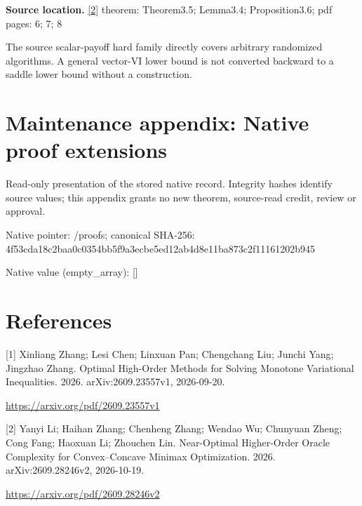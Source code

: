 \documentclass[10pt,a4paper]{article}
\begin{document}
\textbf{Source location.} \href{https://arxiv.org/pdf/2609.28246v2}{[2]} theorem: Theorem3.5; Lemma3.4; Proposition3.6; pdf pages: 6; 7; 8



The source scalar-payoff hard family directly covers arbitrary randomized algorithms. A general vector-VI lower bound is not converted backward to a saddle lower bound without a construction.



\section{Maintenance appendix: Native proof extensions}


Read-only presentation of the stored native record. Integrity hashes identify source values; this appendix grants no new theorem, source-read credit, review or approval.



Native pointer: /proofs; canonical SHA-256: 4f53cda18c2baa0c0354bb5f\allowbreak{}9a3ecbe5ed12ab4d8e11ba87\allowbreak{}3c2f11161202b945



Native value (empty\_array): []



\section{References}


[1] Xinliang Zhang; Lesi Chen; Linxuan Pan; Chengchang Liu; Junchi Yang; Jingzhao Zhang. Optimal High-Order Methods for Solving Monotone Variational Inequalities. 2026. arXiv:2609.23557v1, 2026-09-20.



\url{https://arxiv.org/pdf/2609.23557v1}



[2] Yanyi Li; Haihan Zhang; Chenheng Zhang; Wendao Wu; Chunyuan Zheng; Cong Fang; Haoxuan Li; Zhouchen Lin. Near-Optimal Higher-Order Oracle Complexity for Convex--Concave Minimax Optimization. 2026. arXiv:2609.28246v2, 2026-10-19.



\url{https://arxiv.org/pdf/2609.28246v2}
\end{document}
